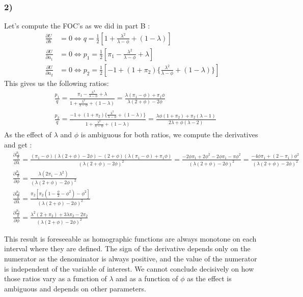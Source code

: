 \documentclass{article}
\begin{document}
\subsubsection{2)}
Let's compute the FOC's as we did in part B : 
$$\begin{aligned}
    \frac{\partial U}{\partial b} &= 0 \Leftrightarrow q= \frac{1}{2}[1+\frac{\lambda^2}{\lambda-\phi}+(1-\lambda)]\\
     \frac{\partial U}{\partial a_1} &= 0 \Leftrightarrow p_1 = \frac{1}{2}[\pi_1-\frac{\lambda^2}{\lambda -\phi}+\lambda]\\
     \frac{\partial U}{\partial a_2} &= 0 \Leftrightarrow p_2 = \frac{1}{2}[-1+(1+\pi_2)\{\frac{\lambda^2}{\lambda-\phi}+(1-\lambda)\}]
\end{aligned}$$
This gives us the following ratios: 
$$\begin{aligned}
    &\frac{p_1}{q} = \frac{\pi_1-\frac{\lambda^2}{\lambda-\phi}+\lambda}{1+\frac{\lambda^2}{\lambda-\phi}+(1-\lambda)} = \frac{\lambda(\pi_1-\phi)+\pi_1\phi}{\lambda (2+\phi)-2\phi}\\
    &\frac{p_2}{q} = \frac{-1+(1+\pi_2)\{\frac{\lambda^2}{\lambda-\phi}+(1-\lambda)\}}{1+\frac{\lambda^2}{\lambda-\phi}+(1-\lambda)} = \frac{\lambda\phi(1+\pi_2)+\pi_2(\lambda-1)}{2\lambda +\phi (\lambda -2)}
\end{aligned}$$
As the effect of $\lambda$ and $\phi$ is ambiguous for both ratios, we compute the derivatives and get :
$$\begin{aligned}
  &\frac{\partial\frac{p_1}{q}}{\partial \lambda }=  \frac{(\pi_1-\phi)(\lambda(2+\phi)-2\phi)-(2+\phi)(\lambda(\pi_1-\phi)+\pi_1\phi)}{(\lambda(2+\phi)-2\phi)^2} = \frac{-2\phi\pi_1+2\phi^2-2\phi\pi_1-\pi\phi^2}{(\lambda(2+\phi)-2\phi)^2} = \frac{-4\phi \pi_1+(2-\pi_1)\phi^2}{(\lambda(2+\phi)-2\phi)^2}\\
  &\frac{\partial\frac{p_1}{q}}{\partial \phi }= \frac{\lambda(2\pi_1-\lambda^2)}{(\lambda(2+\phi)-2\phi)^2}\\
   &\frac{\partial\frac{p_2}{q}}{\partial \lambda } = \frac{\pi_2[\pi_2(1-\frac{\phi}{2}-\phi^2)-\phi^2]}{(\lambda(2+\phi)-2\phi)^2}\\
   &\frac{\partial\frac{p_2}{q}}{\partial \phi } = \frac{\lambda^2(2+\pi_2)+3\lambda\pi_2-2\pi_2}{(\lambda(2+\phi)-2\phi)^2}
\end{aligned}$$

This result is foreseeable as homographic functions  are always monotone on each interval where they are defined. The sign of the derivative depends only on the numerator as the denominator is always positive, and the value of the numerator is independent of the variable of interest.
We cannot conclude decisively on how those ratios vary as a function of $\lambda$ and as a function of $\phi$ as the effect is ambiguous and depends on other parameters. 
\end{document}
